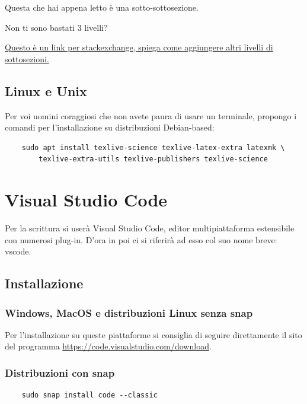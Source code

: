 \documentclass[envcountsame,envcountchap]{svmono}
\begin{document}
Questa che hai appena letto è una sotto-sottosezione.

Non ti sono bastati 3 livelli?

\href{https://tex.stackexchange.com/questions/60209/how-to-add-an-extra-level-of-sections-with-headings-below-subsubsection}{Questo è un link per stackexchange, spiega come aggiungere altri livelli di sottosezioni.}

\subsection{Linux e Unix}
Per voi uomini coraggiosi che non avete paura di usare un terminale, propongo i comandi per l'installazione su distribuzioni Debian-based:
\begin{verbatim}
    sudo apt install texlive-science texlive-latex-extra latexmk \
        texlive-extra-utils texlive-publishers texlive-science
\end{verbatim}

\section{Visual Studio Code}
Per la scrittura si userà Visual Studio Code, editor multipiattaforma estensibile con numerosi plug-in.
D'ora in poi ci si riferirà ad esso col suo nome breve: vscode.

\subsection{Installazione}
\subsubsection{Windows, MacOS e distribuzioni Linux senza snap}
Per l'installazione su queste piattaforme si consiglia di seguire direttamente il sito del programma \url{https://code.visualstudio.com/download}.

\subsubsection{Distribuzioni con snap}
\begin{verbatim}
    sudo snap install code --classic
\end{verbatim}
\end{document}
